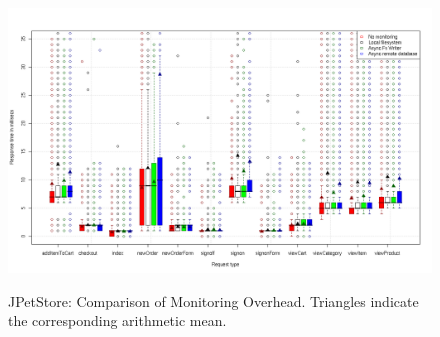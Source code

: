 \documentclass[a4paper,12pt]{scrartcl}
\begin{document}


\begin{figure}
 \centering
 \includegraphics[width=\textwidth]{MonitoringOverhead2.png}
 \label{MonitoringOverhead2}
 \caption{JPetStore: Comparison of Monitoring Overhead. Triangles indicate the corresponding arithmetic mean.}
\end{figure}
\end{document}
